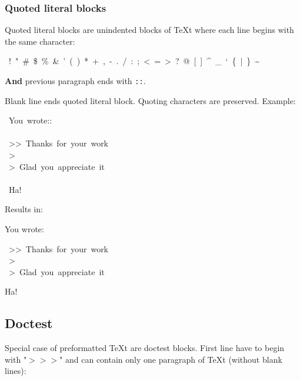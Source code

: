 \documentclass[12pt]{article}
\begin{document}
\hypertarget{lquoted-literal-blocks}{}
\subsubsection{Quoted literal blocks}

Quoted literal blocks are unindented blocks of \TeX{}t where each line begins
with the same character:

\begin{ttfamily}\begin{flushleft}
\mbox{~!~"~\#~\$~\%~\&~'~(~)~*~+~,~-~.~/~:~;~<~=~>~?~@~[~]~\^{}~\_~`~\{~|~\}~\~{}}\\
\end{flushleft}\end{ttfamily}

\textbf{And} previous paragraph ends with \texttt{::}.

Blank line ends quoted literal block. Quoting characters are preserved.
Example:

\begin{ttfamily}\begin{flushleft}
\mbox{~You~wrote::}\\
\mbox{}\\
\mbox{~>>~Thanks~for~your~work}\\
\mbox{~>}\\
\mbox{~>~Glad~you~appreciate~it}\\
\mbox{}\\
\mbox{~Ha!}\\
\end{flushleft}\end{ttfamily}

Results in:

You wrote:

\begin{ttfamily}\begin{flushleft}
\mbox{~>>~Thanks~for~your~work}\\
\mbox{~>}\\
\mbox{~>~Glad~you~appreciate~it}\\
\end{flushleft}\end{ttfamily}

Ha!

\hypertarget{ldoctest}{}
\subsection{Doctest}

Special case of preformatted \TeX{}t are doctest blocks. First line have to begin
with "$>$$>$$>$" and can contain only one paragraph of \TeX{}t (without blank lines):
\end{document}
